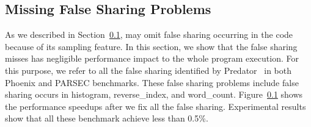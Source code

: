 \subsection{Missing False Sharing Problems}

As we described in Section~\ref{}, \cheetah{} may omit false sharing occurring in the code because of its sampling feature. In this section, we show that the false sharing \cheetah{} misses has negligible performance impact to the whole program execution.  For this purpose, we refer to all the false sharing identified by Predator~\cite{} in both Phoenix and PARSEC benchmarks. These false sharing problems include false sharing occurs in histogram, reverse\_index, and word\_count. Figure~\ref{} shows the performance speedups after we fix all the false sharing. Experimental results show that all these benchmark achieve less than 0.5\%. 

